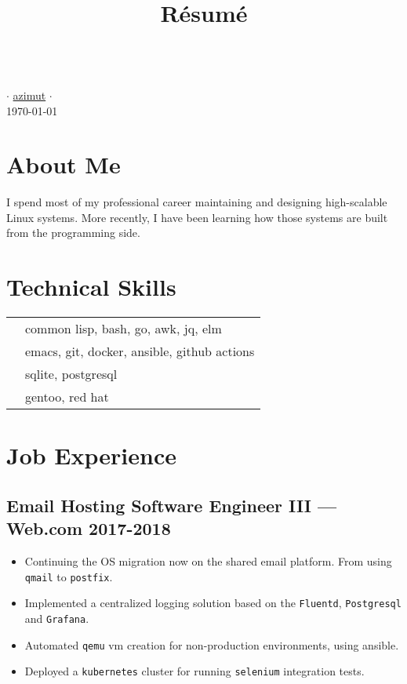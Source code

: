 \documentclass[11pt]{article}
\renewcommand{\maketitle}{
  \begin{center}{\huge\bfseries\theauthor} \\
    \vspace{.25em}
    {\faEnvelope} \href {mailto:\MAILTO} {\expandafter\randomize\expandafter{\MAILTO}} $\cdot$
    {\faGithub} \href {https://github.com/azimut} {azimut} $\cdot$
    {\faLinkedin} \href {https://www.linkedin.com/in/\LINKEDIN} {\LINKEDIN} \\
    \vspace{.25em}
    \today
  \end{center}
}
\begin{document}
\title{R\'esum\'e}
\author{\FULLNAME}

\maketitle


\begin{multicols}{2}
  \section{About Me}
  I spend most of my professional career maintaining and designing high-scalable Linux systems. More recently, I have been learning how those systems are built from the programming side.
  \columnbreak
  \section{Technical Skills}
  \begin{center}
    \begin{tabular}{ c l@{} }
      \raisebox{-0.2\height}{\faCode}     & common lisp, bash, go, awk, jq, elm \\
      \raisebox{-0.2\height}{\faWrench}   & emacs, git, docker, ansible, github actions \\
      \raisebox{-0.2\height}{\faDatabase} & sqlite, postgresql \\
      \raisebox{-0.2\height}{\faLinux}    & gentoo, red hat
    \end{tabular}
  \end{center}
\end{multicols}


\section{Job Experience}


\subsection{Email Hosting Software Engineer III --- Web.com \hfill 2017-2018}
\begin{itemize}
\item Continuing the OS migration now on the shared email platform. From using \texttt{qmail} to \texttt{postfix}.
\item Implemented a centralized logging solution based on the \texttt{Fluentd}, \texttt{Postgresql} and \texttt{Grafana}.
\item Automated \texttt{qemu} vm creation for non-production environments, using ansible.
\item Deployed a \texttt{kubernetes} cluster for running \texttt{selenium} integration tests.
\end{itemize}
\end{document}
